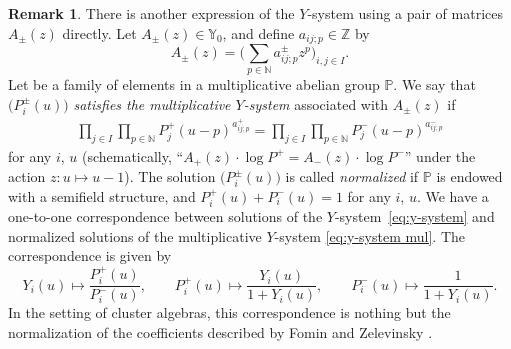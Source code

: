 \documentclass[10pt,a4paper]{amsart}
\numberwithin{equation}{section}
\theoremstyle{definition}
\newtheorem{Remark}[Theorem]{Remark}
\begin{document}
\begin{Remark}
 There is another expression of the $Y$-system using a pair of matrices $A_\pm (z)$ directly.
 Let $A_\pm (z) \in \mathbb{Y}_0$, and define $a_{ij;p} \in \mathbb{Z}$ by
 \begin{equation*}
 A_\pm (z) = \biggl( \sum_{p \in \mathbb{N}} a_{ij;p}^\pm z^p \biggr)_{i,j \in I}.
 \end{equation*}
 Let  be a family of elements in
 a multiplicative abelian group $\mathbb{P}$.
 We say that $\bigl(P_i^\pm (u)\bigr)$ \emph{satisfies the multiplicative $Y$-system} associated with $A_\pm (z)$ if
 \begin{align}\label{eq:y-system mul}
 \prod_{j \in I} \prod_{p \in \mathbb{N}} P_j^+ (u-p)^{a_{ij;p}^+}
 = \prod_{j \in I} \prod_{p \in \mathbb{N}} P_j^- (u-p)^{a_{ij;p}^-}
 \end{align}
 for any $i$, $u$ (schematically, ``$A_+(z) \cdot \log P^+ = A_-(z) \cdot \log P^-$''
 under the action $z\colon u \mapsto u-1$).
 The solution $\bigl(P_i^\pm (u)\bigr)$ is called \emph{normalized} if
 $\mathbb{P}$ is endowed with a semifield structure, and
$
 P_i^+(u) + P_i^-(u) = 1
$
 for any $i$, $u$.
 We have a one-to-one correspondence between solutions of the $Y$-system~\eqref{eq:y-system} and
 normalized solutions of the multiplicative $Y$-system \eqref{eq:y-system mul}.
 The correspondence is given by
 \begin{equation*}
 Y_i (u) \mapsto \frac{P_i^+(u)}{P_i^-(u)},\qquad
 P_i^+ (u) \mapsto \frac{Y_i(u)}{1+Y_i(u)},\qquad
 P_i^- (u) \mapsto \frac{1}{1+Y_i(u)}.
 \end{equation*}
 In the setting of cluster algebras, this correspondence is nothing but
 the normalization of the coefficients described by Fomin and Zelevinsky \cite[Section 5]{FZ1}.
\end{Remark}
\end{document}

